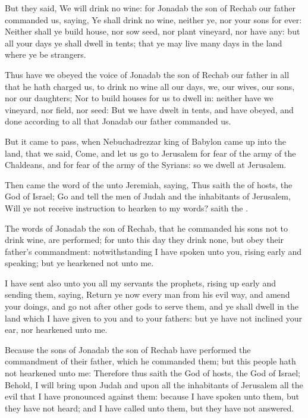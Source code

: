 \Verse But they said, We will drink no wine: for Jonadab the son of Rechab our father commanded us, saying, Ye shall drink no wine, neither ye, nor your sons for ever: \Verse Neither shall ye build house, nor sow seed, nor plant vineyard, nor have any: but all your days ye shall dwell in tents; that ye may live many days in the land where ye be strangers.

\Verse Thus have we obeyed the voice of Jonadab the son of Rechab our father in all that he hath charged us, to drink no wine all our days, we, our wives, our sons, nor our daughters; \Verse Nor to build houses for us to dwell in: neither have we vineyard, nor field, nor seed: \Verse But we have dwelt in tents, and have obeyed, and done according to all that Jonadab our father commanded us.

\Verse But it came to pass, when Nebuchadrezzar king of Babylon came up into the land, that we said, Come, and let us go to Jerusalem for fear of the army of the Chaldeans, and for fear of the army of the Syrians: so we dwell at Jerusalem.

\Verse Then came the word of the \LORD unto Jeremiah, saying, \Verse Thus saith the \LORD of hosts, the God of Israel; Go and tell the men of Judah and the inhabitants of Jerusalem, Will ye not receive instruction to hearken to my words? saith the \LORD.

\Verse The words of Jonadab the son of Rechab, that he commanded his sons not to drink wine, are performed; for unto this day they drink none, but obey their father's commandment: notwithstanding I have spoken unto you, rising early and speaking; but ye hearkened not unto me.

\Verse I have sent also unto you all my servants the prophets, rising up early and sending them, saying, Return ye now every man from his evil way, and amend your doings, and go not after other gods to serve them, and ye shall dwell in the land which I have given to you and to your fathers: but ye have not inclined your ear, nor hearkened unto me.

\Verse Because the sons of Jonadab the son of Rechab have performed the commandment of their father, which he commanded them; but this people hath not hearkened unto me: \Verse Therefore thus saith the \LORD God of hosts, the God of Israel; Behold, I will bring upon Judah and upon all the inhabitants of Jerusalem all the evil that I have pronounced against them: because I have spoken unto them, but they have not heard; and I have called unto them, but they have not answered.

